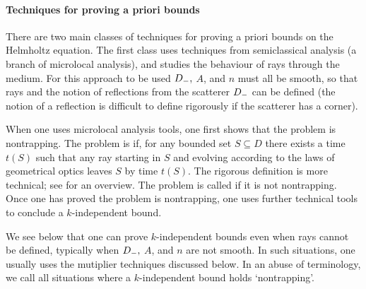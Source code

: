 \def\techtitle{Techniques for proving a priori bounds}
\paragraph{\techtitle} There are two main classes of techniques for proving a priori bounds on the Helmholtz equation. The first class uses techniques from semiclassical analysis (a branch of microlocal analysis), and studies the behaviour of rays through the medium. For this approach to be used $D_{-},$ $A$, and $n$ must all be smooth, so that rays and the notion of reflections from the scatterer $D_{-}$ can be defined (the notion of a reflection is difficult to define rigorously if the scatterer has a corner). 

When one uses microlocal analysis tools, one first shows that the problem is nontrapping. The problem is  if, for any bounded set $S \subseteq D$ there exists a time $t(S)$ such that any ray starting in $S$ and evolving according to the laws of geometrical optics leaves $S$ by time $t(S)$. The rigorous definition is more technical; see \cite[Section 6]{GrPeSp:19} for an overview. The problem is called  if it is not nontrapping. Once one has proved the problem is nontrapping, one uses further technical tools to conclude a $k$-independent bound.


We see below that one can prove $k$-independent bounds even when rays cannot be defined, typically when $D_{-},$ $A$, and $n$ are not smooth. In such situations, one usually uses the mutiplier techniques discussed below. In an abuse of terminology, we call all situations where a $k$-independent bound holds `nontrapping'.\label{pg:informalnontrapping}


